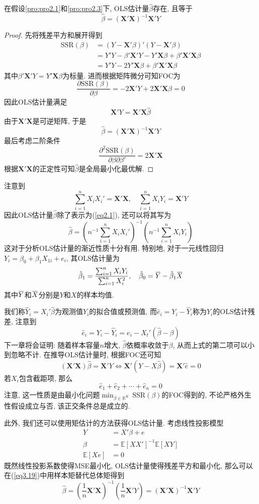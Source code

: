 \documentclass[cn, 12pt, math=mtpro2, bibstyle=apa, blue, twocol]{elegantbook}
\newcommand{\R}{\mathbb{R}}
\newcommand{\E}{\mathbb{E}}
\newcommand{\X}{\mathbold{X}}
\newcommand{\hb}{\hat{\beta}}
\newcommand{\overbar}[1]{\mkern 1.5mu\overline{\mkern-1.5mu#1\mkern-1.5mu}\mkern 1.5mu}
\begin{document}
\begin{theorem}[OLS估计量的存在性]
  在假设\ref{pro:pro2.1}和\ref{pro:pro2.3}下, OLS估计量$\hat{\beta}$存在, 且等于
  \begin{equation}\label{eq2.1}
    \hat{\beta}=(\X'\X)^{-1}\X'Y
  \end{equation}
\end{theorem}
\begin{proof}
  先将残差平方和展开得到
  \begin{align*}\text{SSR}(\beta)&=(Y-\X'\beta)'(Y-\X'\beta) \\
  &=Y'Y-\beta'\X'Y-Y'\X\beta+\beta'\X'\X\beta\\
  &=Y'Y-2Y'\X\beta+\beta'\X'\X\beta
  \end{align*}
  其中$\beta'\X'Y=Y'\X\beta$为标量. 进而根据矩阵微分可知FOC为
  $$\frac{\partial \text{SSR}(\beta)}{\partial\beta}=-2\X'Y+2\X'\X\beta=0$$
  因此OLS估计量满足
  $$\X'Y=\X'\X\hat{\beta}$$
  由于$\X'\X$是可逆矩阵, 于是
  $$\hat{\beta}=(\X'\X)^{-1}\X'Y$$
  最后考虑二阶条件
  $$\frac{\partial^2\text{SSR}(\beta)}{\partial\beta\partial\beta'}=2\X'\X$$
  根据$\X'\X$的正定性可知$\hat{\beta}$是全局最小化最优解.
\end{proof}

注意到
$$\sum_{i=1}^{n}X_iX_i'=\X'\X,\quad\sum_{i=1}^{n}X_iY_i=\X'Y$$
因此OLS估计量$\hat{\beta}$除了表示为(\ref{eq2.1}), 还可以将其写为
$$\hat{\beta}=\left(n^{-1}\sum_{i=1}^{n}X_iX_i'\right)^{-1}\left(n^{-1}\sum_{i=1}^{n}X_iY_i\right)$$
这对于分析OLS估计量的渐近性质十分有用.  特别地, 对于一元线性回归$Y_i=\beta_0+\beta_1X_{1i}+e_i$, 其OLS估计量为
$$\hb_1=\frac{\sum_{i=1}^{n}X_iY_i}{\sum_{i=1}^{n}X_i^2},\quad \hb_0=\overbar{Y}-\hat{\beta}_1\overbar{X}$$
其中$\overbar{Y}$和$\overbar{X}$分别是$Y$和$X$的样本均值.


我们称$\hat{Y}_i=X_i'\hb$为观测值$Y_i$的拟合值或预测值, 而$\hat{e}_i=Y_i-\hat{Y}_i$称为$Y_i$的OLS估计残差, 注意到
$$\hat{e}_i=Y_i-\hat{Y}_i=e_i-X_t'(\hb-\beta)$$
下一章将会证明: 随着样本容量$n$增大, $\hat{\beta}$依概率收敛于$\beta$, 从而上式的第二项可以小到忽略不计. 在推导OLS估计量时, 根据FOC还可知
$$(\X'\X)\hat{\beta}=\X'Y\Longleftrightarrow \X'(Y-X\hat{\beta})=\X'\hat{e}=0$$
若$X_i$包含截距项, 那么
$$\hat{e}_1+\hat{e}_2+\cdots+\hat{e}_n=0$$
注意, 这一性质是由最小化问题$\displaystyle\min_{\beta\in\R^K}\,\text{SSR}(\beta)$的FOC得到的, 不论严格外生性假设成立与否, 该正交条件总是成立的.

此外, 我们还可以使用矩估计的方法获得OLS估计量. 考虑线性投影模型
\begin{align}
Y&=X'\beta+e \nonumber\\
\beta&=\E[XX']^{-1}\E[XY] \label{eq3.19} \\
\E[Xe]&=0 \nonumber
\end{align}
既然线性投影系数使得MSE最小化, OLS估计量使得残差平方和最小化, 那么可以在(\ref{eq3.19})中用样本矩替代总体矩得到
$$\hb=\left(\frac{1}{n}\X'\X\right)^{-1}\left(\frac{1}{n}\X'Y\right)=(\X'\X)^{-1}\X'Y$$
\end{document}
